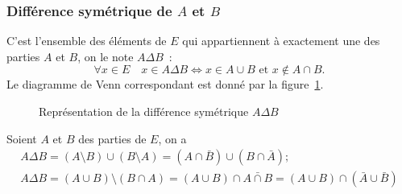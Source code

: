 \subsubsection{Différence symétrique de $A$ et $B$}
\label{chap3-subsubsec:differencesymetrique}
C'est l'ensemble des éléments de $E$ qui appartiennent à exactement une des parties $A$ et $B$, on le note $A \Delta
B$~:
\begin{equation}
  \forall x \in E \quad x \in A \Delta B \iff x \in A \cup B \text{~et~} x \not\in A \cap B.
\end{equation}
Le diagramme de Venn correspondant est donné par la figure~\ref{chap3-fig:diffsym}.

\begin{figure}
\centering
{}
\caption{Représentation de la différence symétrique $A \Delta B$}
\label{chap3-fig:diffsym}
\end{figure}

\begin{prop}
  Soient $A$ et $B$ des parties de $E$, on a 
  \begin{gather}
    A \Delta B = (A\setminus B) \cup (B \setminus A) = (A \cap \bar{B}) \cup (B \cap \bar{A}); \\
    A \Delta B =(A \cup B) \setminus (B \cap A) = (A \cup B) \cap \bar{A \cap B} =(A \cup B) \cap (\bar{A} \cup \bar{B})
  \end{gather}
\end{prop}

